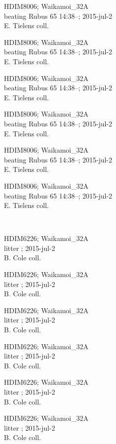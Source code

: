 \documentclass[2pt]{extarticle}
\begin{document}
\noindent
\parbox{0.16\textwidth}{\tiny \raggedright \rule[-0.3\baselineskip]{0pt}{10pt}HDIM8006; Waikamoi\_32A\\ beating Rubus 65 14:38--; 2015-jul-2\\ E. Tielens coll.}
\parbox{0.16\textwidth}{\tiny \raggedright \rule[-0.3\baselineskip]{0pt}{10pt}HDIM8006; Waikamoi\_32A\\ beating Rubus 65 14:38--; 2015-jul-2\\ E. Tielens coll.}
\parbox{0.16\textwidth}{\tiny \raggedright \rule[-0.3\baselineskip]{0pt}{10pt}HDIM8006; Waikamoi\_32A\\ beating Rubus 65 14:38--; 2015-jul-2\\ E. Tielens coll.}
\parbox{0.16\textwidth}{\tiny \raggedright \rule[-0.3\baselineskip]{0pt}{10pt}HDIM8006; Waikamoi\_32A\\ beating Rubus 65 14:38--; 2015-jul-2\\ E. Tielens coll.}
\parbox{0.16\textwidth}{\tiny \raggedright \rule[-0.3\baselineskip]{0pt}{10pt}HDIM8006; Waikamoi\_32A\\ beating Rubus 65 14:38--; 2015-jul-2\\ E. Tielens coll.}
\parbox{0.16\textwidth}{\tiny \raggedright \rule[-0.3\baselineskip]{0pt}{10pt}HDIM8006; Waikamoi\_32A\\ beating Rubus 65 14:38--; 2015-jul-2\\ E. Tielens coll.} \\ 
\vspace{0.001in} 

\noindent
\parbox{0.16\textwidth}{\tiny \raggedright \rule[-0.3\baselineskip]{0pt}{10pt}HDIM6226; Waikamoi\_32A\\ litter  ; 2015-jul-2\\ B. Cole coll.}
\parbox{0.16\textwidth}{\tiny \raggedright \rule[-0.3\baselineskip]{0pt}{10pt}HDIM6226; Waikamoi\_32A\\ litter  ; 2015-jul-2\\ B. Cole coll.}
\parbox{0.16\textwidth}{\tiny \raggedright \rule[-0.3\baselineskip]{0pt}{10pt}HDIM6226; Waikamoi\_32A\\ litter  ; 2015-jul-2\\ B. Cole coll.}
\parbox{0.16\textwidth}{\tiny \raggedright \rule[-0.3\baselineskip]{0pt}{10pt}HDIM6226; Waikamoi\_32A\\ litter  ; 2015-jul-2\\ B. Cole coll.}
\parbox{0.16\textwidth}{\tiny \raggedright \rule[-0.3\baselineskip]{0pt}{10pt}HDIM6226; Waikamoi\_32A\\ litter  ; 2015-jul-2\\ B. Cole coll.}
\parbox{0.16\textwidth}{\tiny \raggedright \rule[-0.3\baselineskip]{0pt}{10pt}HDIM6226; Waikamoi\_32A\\ litter  ; 2015-jul-2\\ B. Cole coll.} \\ 
\vspace{0.001in} 
\end{document}
